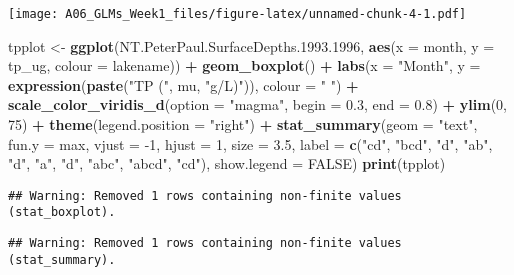\documentclass[]{article}
\newenvironment{Shaded}{\begin{snugshade}}{\end{snugshade}}
\newcommand{\DataTypeTok}[1]{\textcolor[rgb]{0.13,0.29,0.53}{#1}}
\newcommand{\DecValTok}[1]{\textcolor[rgb]{0.00,0.00,0.81}{#1}}
\newcommand{\FloatTok}[1]{\textcolor[rgb]{0.00,0.00,0.81}{#1}}
\newcommand{\KeywordTok}[1]{\textcolor[rgb]{0.13,0.29,0.53}{\textbf{#1}}}
\newcommand{\NormalTok}[1]{#1}
\newcommand{\OperatorTok}[1]{\textcolor[rgb]{0.81,0.36,0.00}{\textbf{#1}}}
\newcommand{\OtherTok}[1]{\textcolor[rgb]{0.56,0.35,0.01}{#1}}
\newcommand{\StringTok}[1]{\textcolor[rgb]{0.31,0.60,0.02}{#1}}
\begin{document}
\texttt{[image: A06\_GLMs\_Week1\_files/figure-latex/unnamed-chunk-4-1.pdf]}

\begin{Shaded}
\begin{Highlighting}[]
\NormalTok{tpplot <-}\StringTok{ }\KeywordTok{ggplot}\NormalTok{(NT.PeterPaul.SurfaceDepths.}\FloatTok{1993.1996}\NormalTok{,  }\KeywordTok{aes}\NormalTok{(}\DataTypeTok{x =}\NormalTok{ month, }\DataTypeTok{y =}\NormalTok{ tp_ug, }\DataTypeTok{colour =}\NormalTok{ lakename)) }\OperatorTok{+}
\StringTok{  }\KeywordTok{geom_boxplot}\NormalTok{() }\OperatorTok{+}
\StringTok{  }\KeywordTok{labs}\NormalTok{(}\DataTypeTok{x =} \StringTok{"Month"}\NormalTok{, }\DataTypeTok{y =} \KeywordTok{expression}\NormalTok{(}\KeywordTok{paste}\NormalTok{(}\StringTok{"TP ("}\NormalTok{, mu, }\StringTok{"g/L)"}\NormalTok{)), }\DataTypeTok{colour =} \StringTok{" "}\NormalTok{) }\OperatorTok{+}\StringTok{ }
\StringTok{  }\KeywordTok{scale_color_viridis_d}\NormalTok{(}\DataTypeTok{option =} \StringTok{"magma"}\NormalTok{, }\DataTypeTok{begin =} \FloatTok{0.3}\NormalTok{, }\DataTypeTok{end =} \FloatTok{0.8}\NormalTok{) }\OperatorTok{+}
\StringTok{  }\KeywordTok{ylim}\NormalTok{(}\DecValTok{0}\NormalTok{, }\DecValTok{75}\NormalTok{) }\OperatorTok{+}
\StringTok{  }\KeywordTok{theme}\NormalTok{(}\DataTypeTok{legend.position =} \StringTok{"right"}\NormalTok{) }\OperatorTok{+}\StringTok{ }
\StringTok{  }\KeywordTok{stat_summary}\NormalTok{(}\DataTypeTok{geom =} \StringTok{"text"}\NormalTok{, }\DataTypeTok{fun.y =}\NormalTok{ max, }\DataTypeTok{vjust =} \DecValTok{-1}\NormalTok{, }\DataTypeTok{hjust =} \DecValTok{1}\NormalTok{, }\DataTypeTok{size =} \FloatTok{3.5}\NormalTok{,}
               \DataTypeTok{label =} \KeywordTok{c}\NormalTok{(}\StringTok{"cd"}\NormalTok{, }\StringTok{"bcd"}\NormalTok{, }\StringTok{"d"}\NormalTok{, }\StringTok{"ab"}\NormalTok{, }\StringTok{"d"}\NormalTok{, }\StringTok{"a"}\NormalTok{, }\StringTok{"d"}\NormalTok{, }\StringTok{"abc"}\NormalTok{, }\StringTok{"abcd"}\NormalTok{, }\StringTok{"cd"}\NormalTok{), }\DataTypeTok{show.legend =} \OtherTok{FALSE}\NormalTok{) }
\KeywordTok{print}\NormalTok{(tpplot)}
\end{Highlighting}
\end{Shaded}

\begin{verbatim}
## Warning: Removed 1 rows containing non-finite values (stat_boxplot).
\end{verbatim}

\begin{verbatim}
## Warning: Removed 1 rows containing non-finite values (stat_summary).
\end{verbatim}
\end{document}
